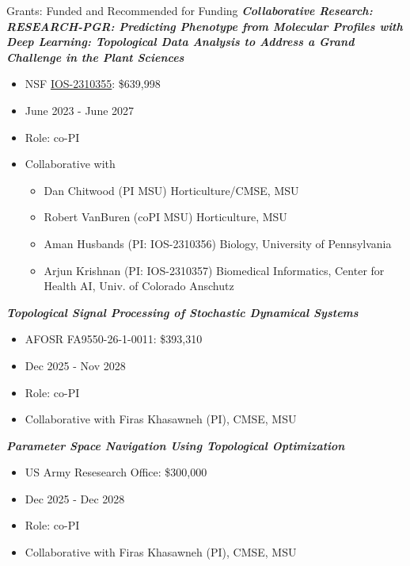 \documentclass{resume} %
\begin{document}
\begin{rSection}{Grants: Funded and Recommended for Funding}
\textbf{\textit{Collaborative Research: RESEARCH-PGR: Predicting Phenotype from Molecular Profiles with Deep Learning: Topological Data Analysis to Address a Grand Challenge in the Plant Sciences}}
\vspace{-.1in}
\begin{itemize}{}{\leftmargin=0em}
   \itemsep -0.6em %
   \item
NSF \href{https://nsf.gov/awardsearch/showAward?AWD_ID=2310355}{IOS-2310355}:  \$639,998
\item
June 2023 - June 2027
   \item
Role: co-PI
\item Collaborative with
\begin{itemize}
   \itemsep -0.6em %
   \item Dan Chitwood (PI MSU) Horticulture/CMSE, MSU 
   \item  Robert VanBuren (coPI MSU) Horticulture, MSU
   \item Aman Husbands (PI: IOS-2310356) Biology, University of Pennsylvania
   \item Arjun Krishnan (PI: IOS-2310357) Biomedical Informatics, Center for Health AI, Univ. of Colorado Anschutz
\end{itemize}

\end{itemize}


\textbf{\textit{Topological Signal Processing of Stochastic Dynamical Systems}}
\vspace{-.1in}
\begin{itemize}{}{\leftmargin=0em}
   \itemsep -0.6em %
   \item
AFOSR FA9550-26-1-0011:  \$393,310
\item
Dec 2025 - Nov 2028
   \item
Role: co-PI
\item Collaborative with Firas Khasawneh (PI), CMSE, MSU

\end{itemize}

\textbf{\textit{Parameter Space Navigation Using Topological Optimization}}
\vspace{-.1in}
\begin{itemize}{}{\leftmargin=0em}
   \itemsep -0.6em %
   \item
US Army Resesearch Office:  \$300,000
\item
Dec 2025 - Dec 2028
   \item
Role: co-PI
\item Collaborative with Firas Khasawneh (PI), CMSE, MSU


\end{itemize}
\end{rSection}
\end{document}
